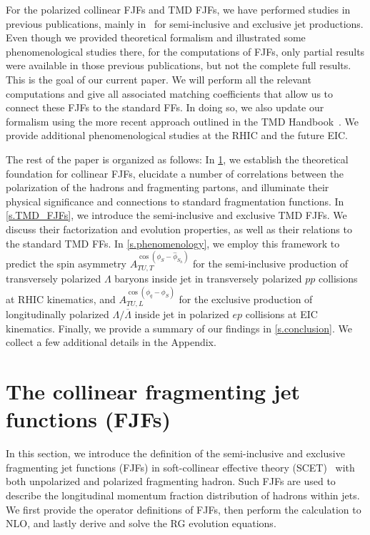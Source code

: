 \documentclass[a4paper, 11 pt]{article}
\begin{document}
For the polarized collinear FJFs and TMD FJFs, we have performed studies in previous publications, mainly in~\cite{Kang:2020xyq,Kang:2021ffh} for semi-inclusive and exclusive jet productions. Even though we provided theoretical formalism and illustrated some phenomenological studies there, for the computations of FJFs, only partial results were available in those previous publications, but not the complete full results. This is the goal of our current paper. We will perform all the relevant computations and give all associated matching coefficients that allow us to connect these FJFs to the standard FFs. In doing so, we also update our formalism using the more recent approach outlined in the TMD Handbook~\cite{Boussarie:2023izj}. We provide additional phenomenological studies at the RHIC and the future EIC. 

The rest of the paper is organized as follows:
In \cref{s.collinear_FJFs}, we establish the theoretical foundation for collinear FJFs, elucidate a number of correlations between the polarization of the hadrons and fragmenting partons, and illuminate their physical significance and connections to standard fragmentation functions.
In \cref{s.TMD_FJFs}, we introduce the semi-inclusive and exclusive TMD FJFs. We discuss their factorization and evolution properties, as well as their relations to the standard TMD FFs. 
In \cref{s.phenomenology}, we employ this framework to predict the spin asymmetry $A_{TU,T}^{\cos(\phi _S - \hat{\phi}_{S_h})}$ for the semi-inclusive production of transversely polarized $\Lambda$ baryons inside jet in transversely polarized $pp$ collisions at RHIC kinematics, and $A_{TU, L}^{\cos(\phi _q - \phi _{S})}$ for the exclusive production of longitudinally polarized $\Lambda/\overline{\Lambda}$ inside jet in polarized $ep$ collisions at EIC kinematics. Finally, we provide a summary of our findings in \cref{s.conclusion}. We collect a few additional details in the Appendix. 

\section{The collinear fragmenting jet functions (FJFs)}
\label{s.collinear_FJFs}
In this section, we introduce the definition of the semi-inclusive and exclusive fragmenting jet functions (FJFs) in soft-collinear effective theory (SCET)~\cite{Bauer:2000ew, Bauer:2000yr, Bauer:2001ct, Bauer:2001yt, Bauer:2002nz} with both unpolarized and polarized fragmenting hadron.
Such FJFs are used to describe the longitudinal momentum fraction distribution of hadrons within jets.
We first provide the operator definitions of FJFs, then perform the calculation to NLO, and lastly derive and solve the RG evolution equations.
\end{document}
